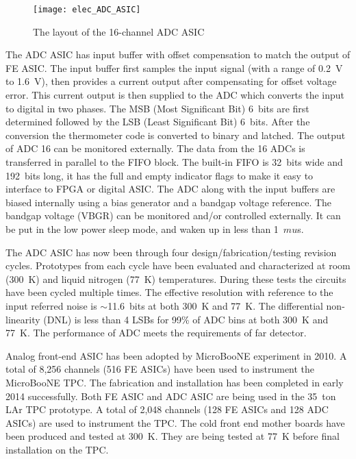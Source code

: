 \begin{figure}[htbp]
\centering
\texttt{[image: elec\_ADC\_ASIC]} %
\caption{The layout of the 16-channel ADC ASIC}
\label{fig:elec_ADC_ASIC}
\end{figure}

The ADC ASIC has input buffer with offset compensation to match the output of FE ASIC.
The input buffer first samples the input signal (with a range of 0.2~V to 1.6~V),
then provides a current output after compensating for offset voltage error.
This current output is then supplied to the ADC which converts the input to digital in two phases.
The MSB (Most Significant Bit) 6~bits are first determined followed by the LSB (Least Significant Bit) 6~bits.
After the conversion the thermometer code is converted to binary and latched.
The output of ADC 16 can be monitored externally.
The data from the 16 ADCs is transferred in parallel to the FIFO block.
The built-in FIFO is 32~bits wide and 192~bits long,
it has the full and empty indicator flags to make it easy to interface to FPGA or digital ASIC.
The ADC along with the input buffers are biased internally using a bias generator and a bandgap voltage reference.
The bandgap voltage (VBGR) can be monitored and/or controlled externally.
It can be put in the low power sleep mode, and waken up in less than 1~$mu$s.

The ADC ASIC has now been through four design/fabrication/testing revision cycles.
Prototypes from each cycle have been evaluated and characterized at room (300~K) and liquid nitrogen (77~K) temperatures.
During these tests the circuits have been cycled multiple times.
The effective resolution with reference to the input referred noise is $\sim$11.6~bits at both 300~K and 77~K.
The differential non-linearity (DNL) is less than 4 LSBs for 99\% of ADC bins at both 300~K and 77~K.
The performance of ADC meets the requirements of far detector.

Analog front-end ASIC has been adopted by MicroBooNE experiment in 2010.
A total of 8,256 channels (516 FE ASICs) have been used to instrument the MicroBooNE TPC.
The fabrication and installation has been completed in early 2014 successfully.
Both FE ASIC and ADC ASIC are being used in the 35~ton LAr TPC prototype.
A total of 2,048 channels (128 FE ASICs and 128 ADC ASICs) are used to instrument the TPC.
The cold front end mother boards have been produced and tested at 300~K.
They are being tested at 77~K before final installation on the TPC.


%
